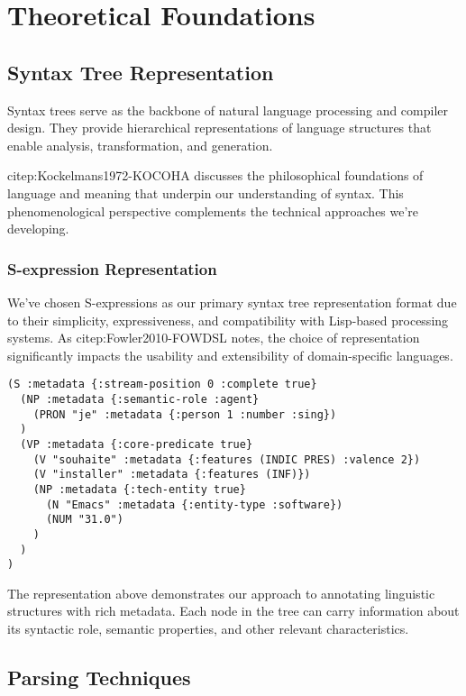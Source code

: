 \documentclass[a4paper,11pt]{article}
\begin{document}
\section{Theoretical Foundations}
\label{sec:org53226cf}

\subsection{Syntax Tree Representation}
\label{sec:orgbcd7a6d}

Syntax trees serve as the backbone of natural language processing and compiler design. They provide hierarchical representations of language structures that enable analysis, transformation, and generation.

citep:Kockelmans1972-KOCOHA discusses the philosophical foundations of language and meaning that underpin our understanding of syntax. This phenomenological perspective complements the technical approaches we're developing.
\subsubsection{S-expression Representation}
\label{sec:org1909f87}

We've chosen S-expressions as our primary syntax tree representation format due to their simplicity, expressiveness, and compatibility with Lisp-based processing systems. As citep:Fowler2010-FOWDSL notes, the choice of representation significantly impacts the usability and extensibility of domain-specific languages.

\begin{verbatim}
(S :metadata {:stream-position 0 :complete true}
  (NP :metadata {:semantic-role :agent}
    (PRON "je" :metadata {:person 1 :number :sing})
  )
  (VP :metadata {:core-predicate true}
    (V "souhaite" :metadata {:features (INDIC PRES) :valence 2})
    (V "installer" :metadata {:features (INF)})
    (NP :metadata {:tech-entity true}
      (N "Emacs" :metadata {:entity-type :software})
      (NUM "31.0")
    )
  )
)
\end{verbatim}

The representation above demonstrates our approach to annotating linguistic structures with rich metadata. Each node in the tree can carry information about its syntactic role, semantic properties, and other relevant characteristics.
\subsection{Parsing Techniques}
\label{sec:org86c4e45}
\end{document}
